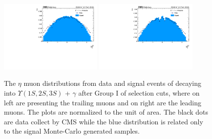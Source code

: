 \begin{figure}[!htbp]
\begin{center}
\includegraphics[width=0.45\textwidth]{figures_and_tables/outputPlots/ZtoUpsilon_Cat0_ZZZZZ/au/data_x_mc/noKinCuts/h_noKin_TrailingMu_eta}\hspace*{1.cm}
\includegraphics[width=0.45\textwidth]{figures_and_tables/outputPlots/ZtoUpsilon_Cat0_ZZZZZ/au/data_x_mc/noKinCuts/h_noKin_LeadingMu_eta}
\end{center}\vspace*{-.5cm}
\caption{The $\eta$ muon distributions from data and signal events of \Z decaying into $\Upsilon(1S,2S,3S)$ + $\gamma$ after Group I of selection cuts, where on left are presenting the trailing muons and on right are the leading muons. The plots are normalized to the unit of area. The black dots are data collect by CMS while the blue distribution is related only to the signal Monte-Carlo generated samples.}
\label{fig:etaMuons_ZtoUpsilon_Cat0}
\end{figure}

